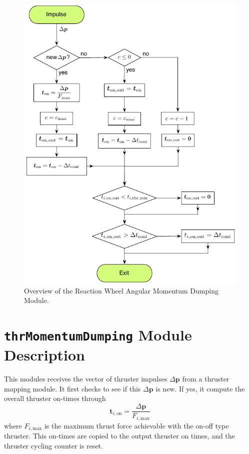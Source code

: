 \documentclass[]{BasiliskReportMemo}
\begin{document}
\begin{figure}[t]
	\centerline{
	\includegraphics[]{Figures/rwMomentumDumping}
	}
	\caption{Overview of the Reaction Wheel Angular Momentum Dumping Module.}
	\label{fig:Fig2}
\end{figure}


\section{{\tt thrMomentumDumping} Module Description}
This modules receives the vector of thruster impulses $\Delta\bm p$ from a thruster mapping module.  It first checks to see if this $\Delta\bm p$ is new.  If yes, it compute the overall thruster on-times through
\begin{equation}
	\bm t_{i,\text{on}} = \frac{\Delta \bm p}{F_{i,\text{max}}}
\end{equation}
where $F_{i,\text{max}}$ is the maximum thrust force achievable with the on-off type thruster.  This on-times are copied to the output thruster on times, and the thruster cycling counter is reset.  
\end{document}
